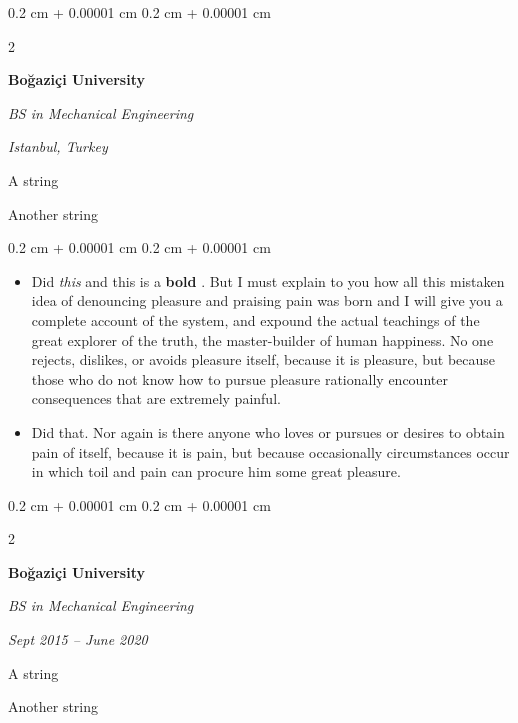 \documentclass[10pt, letterpaper]{article}
\newenvironment{summary}{
    \begin{description}[
        topsep=0.10 cm,
        parsep=0.10 cm,
        partopsep=0pt,
        itemsep=0pt,
        leftmargin=0.4 cm + 10pt
    ]
}{
    \end{description}
} %
\newenvironment{highlights}{
    \begin{itemize}[
        topsep=0.10 cm,
        parsep=0.10 cm,
        partopsep=0pt,
        itemsep=0pt,
        leftmargin=0.4 cm + 10pt
    ]
}{
    \end{itemize}
} %
\newenvironment{onecolentry}{
    \begin{adjustwidth}{
        0.2 cm + 0.00001 cm
    }{
        0.2 cm + 0.00001 cm
    }
}{
    \end{adjustwidth}
} %
\newenvironment{twocolentry}[2][]{
    \onecolentry
    \def\secondColumn{#2}
    \setcolumnwidth{\fill, 4.5 cm}
    \begin{paracol}{2}
}{
    \switchcolumn \raggedleft \secondColumn
    \end{paracol}
    \endonecolentry
} %
\let\hrefWithoutArrow\href
\renewcommand{\href}[2]{\hrefWithoutArrow{#1}{\ifthenelse{\equal{#2}{}}{ }{#2 }\raisebox{.15ex}{\footnotesize \faExternalLink*}}}
\begin{document}
        \begin{twocolentry}{
        \textit{Istanbul, Turkey}    
            
        }
            \textbf{Boğaziçi University}

            \textit{BS in Mechanical Engineering}
        \end{twocolentry}
            \begin{summary}
                \item A string
                \item Another string
            \end{summary}
        \vspace{0.10 cm}
        \begin{onecolentry}
            \begin{highlights}
                \item Did \textit{this} and this is a \textbf{bold} \href{https://example.com}{link}. But I must explain to you how all this mistaken idea of denouncing pleasure and praising pain was born and I will give you a complete account of the system, and expound the actual teachings of the great explorer of the truth, the master-builder of human happiness. No one rejects, dislikes, or avoids pleasure itself, because it is pleasure, but because those who do not know how to pursue pleasure rationally encounter consequences that are extremely painful.
                \item Did that. Nor again is there anyone who loves or pursues or desires to obtain pain of itself, because it is pain, but because occasionally circumstances occur in which toil and pain can procure him some great pleasure.
            \end{highlights}
        \end{onecolentry}


        \vspace{0.2 cm}

        \begin{twocolentry}{
            
            
        \textit{Sept 2015 – June 2020}}
            \textbf{Boğaziçi University}

            \textit{BS in Mechanical Engineering}
        \end{twocolentry}
            \begin{summary}
                \item A string
                \item Another string
            \end{summary}
\end{document}
